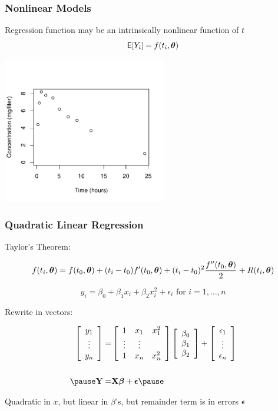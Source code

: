 \documentclass[handout]{beamer}\usepackage[]{graphicx}\usepackage[]{color}
\begin{document}
\begin{frame}
  \frametitle{Nonlinear Models}
Regression function may be an intrinsically nonlinear function of $t$
  $$\textsf{E}[Y_i] = f(t_i, \boldsymbol{\theta})$$

\centerline{ \includegraphics[height=2.5in]{theoph-fig1} }

\end{frame}
\begin{frame} \frametitle{Quadratic Linear Regression}
Taylor's Theorem:

$$f(t_i, \boldsymbol{\theta}) = f(t_0, \boldsymbol{\theta}) + (t_i - t_0) f'(t_0, \boldsymbol{\theta}) + (t_i - t_0)^2
\frac{f''(t_0, \boldsymbol{\theta})}{2}  + R(t_i, \boldsymbol{\theta})$$
\pause


$$y_i = \beta_0 + \beta_1 x_i + \beta_2 x_i^2 + \epsilon_i \text{  for  } i = 1, \ldots, n$$

\pause Rewrite in vectors:

\begin{eqnarray*}
\left[
\begin{array}{c}  y_1 \\ \vdots \\  y_n \end{array}
  \right]   =  &
 \left[ \begin{array}{ccc}  1 &  x_1 & x_1^2 \\ \vdots & \vdots \\ 1 &
     x_n &  x_n^2\end{array}  \right]
 \left[ \begin{array}{c}  \beta_0  \\  \beta_1 \\ \beta_2 \end{array}
 \right] +
\left[ \begin{array}{c}  \epsilon_1 \\ \vdots \\ \epsilon_n  \end{array}
\right] \\
 & \\ \pause
\Y = & \X \b + \eps \pause
\end{eqnarray*}

Quadratic in $x$, but linear in $\beta$'s, but remainder term is in
errors $\boldsymbol{\epsilon}$
\end{frame}
\end{document}
